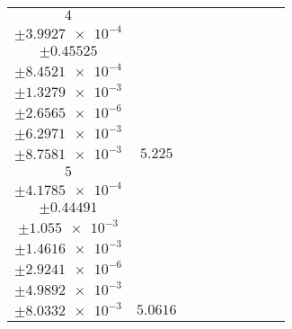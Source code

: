 \documentclass[8pt]{article}
\begin{document}
\begin{longtable}[l]{c c c c c c c c c}
$\num{4}$ & \begin{tabular}[c]{@{}c@{}}$\num{5.9911e-2}$ \\ $\pm\num{3.9927e-4}$\end{tabular} & \begin{tabular}[c]{@{}c@{}}$\num{0.13527}$ \\ $\pm\num{0.45525}$\end{tabular} & \begin{tabular}[c]{@{}c@{}}$\num{2.1409}$ \\ $\pm\num{8.4521e-4}$\end{tabular} & \begin{tabular}[c]{@{}c@{}}$\num{946.88}$ \\ $\pm\num{1.3279e-3}$\end{tabular} & \begin{tabular}[c]{@{}c@{}}$\num{1.8943}$ \\ $\pm\num{2.6565e-6}$\end{tabular} & \begin{tabular}[c]{@{}c@{}}$\num{1.1627}$ \\ $\pm\num{6.2971e-3}$\end{tabular} & \begin{tabular}[c]{@{}c@{}}$\num{4.1828}$ \\ $\pm\num{8.7581e-3}$\end{tabular} & $\num{5.225}$\\
$\num{5}$ & \begin{tabular}[c]{@{}c@{}}$\num{5.899e-2}$ \\ $\pm\num{4.1785e-4}$\end{tabular} & \begin{tabular}[c]{@{}c@{}}$\num{9.4644e-2}$ \\ $\pm\num{0.44491}$\end{tabular} & \begin{tabular}[c]{@{}c@{}}$\num{2.4397}$ \\ $\pm\num{1.055e-3}$\end{tabular} & \begin{tabular}[c]{@{}c@{}}$\num{947.13}$ \\ $\pm\num{1.4616e-3}$\end{tabular} & \begin{tabular}[c]{@{}c@{}}$\num{1.8948}$ \\ $\pm\num{2.9241e-6}$\end{tabular} & \begin{tabular}[c]{@{}c@{}}$\num{1.156}$ \\ $\pm\num{4.9892e-3}$\end{tabular} & \begin{tabular}[c]{@{}c@{}}$\num{4.1483}$ \\ $\pm\num{8.0332e-3}$\end{tabular} & $\num{5.0616}$\\

\end{longtable}
\end{document}
